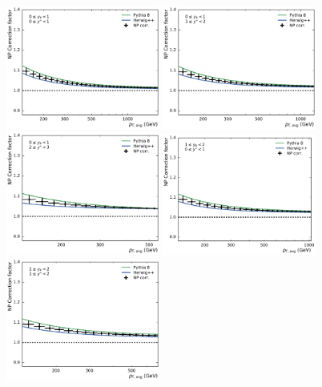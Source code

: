 \begin{figure}[htbp]
    \centering
    \includegraphics[width=0.45\textwidth]{figures/theory/np_factors_calc_yb0ys0.pdf}\hfill
    \includegraphics[width=0.45\textwidth]{figures/theory/np_factors_calc_yb0ys1.pdf}
    \includegraphics[width=0.45\textwidth]{figures/theory/np_factors_calc_yb0ys2.pdf}\hfill
    \includegraphics[width=0.45\textwidth]{figures/theory/np_factors_calc_yb1ys0.pdf}
    \includegraphics[width=0.45\textwidth]{figures/theory/np_factors_calc_yb1ys1.pdf}\hfill

\end{figure}
